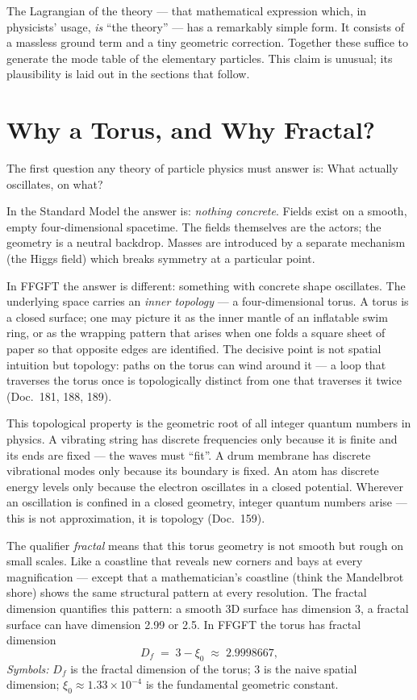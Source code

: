 The Lagrangian of the theory --- that mathematical expression which,
in physicists' usage, \emph{is} \enquote{the theory} --- has a
remarkably simple form. It consists of a massless ground term and a
tiny geometric correction. Together these suffice to generate the
mode table of the elementary particles. This claim is unusual; its
plausibility is laid out in the sections that follow.

\section{Why a Torus, and Why Fractal?}

The first question any theory of particle physics must answer is:
What actually oscillates, on what?

In the Standard Model the answer is: \emph{nothing concrete}.
Fields exist on a smooth, empty four-dimensional spacetime. The
fields themselves are the actors; the geometry is a neutral
backdrop. Masses are introduced by a separate mechanism (the Higgs
field) which breaks symmetry at a particular point.

In FFGFT the answer is different: something with concrete shape
oscillates. The underlying space carries an \emph{inner topology} ---
a four-dimensional torus. A torus is a closed surface; one may
picture it as the inner mantle of an inflatable swim ring, or as
the wrapping pattern that arises when one folds a square sheet of
paper so that opposite edges are identified. The decisive point is
not spatial intuition but topology: paths on the torus can wind
around it --- a loop that traverses the torus once is topologically
distinct from one that traverses it twice (Doc.~181, 188, 189).

This topological property is the geometric root of all integer
quantum numbers in physics. A vibrating string has discrete
frequencies only because it is finite and its ends are fixed --- the
waves must \enquote{fit}. A drum membrane has discrete vibrational
modes only because its boundary is fixed. An atom has discrete
energy levels only because the electron oscillates in a closed
potential. Wherever an oscillation is confined in a closed geometry,
integer quantum numbers arise --- this is not approximation, it is
topology (Doc.~159).

The qualifier \emph{fractal} means that this torus geometry is not
smooth but rough on small scales. Like a coastline that reveals new
corners and bays at every magnification --- except that a
mathematician's coastline (think the Mandelbrot shore) shows the
same structural pattern at every resolution. The fractal dimension
quantifies this pattern: a smooth 3D surface has dimension 3, a
fractal surface can have dimension 2.99 or 2.5. In FFGFT the torus
has fractal dimension
\[
  D_f \;=\; 3 - \xi_0 \;\approx\; 2{.}9998667,
\]
\noindent\textit{Symbols:} $D_f$ is the fractal dimension of the
torus; $3$ is the naive spatial dimension; $\xi_0 \approx
1{.}33\times 10^{-4}$ is the fundamental geometric constant.

